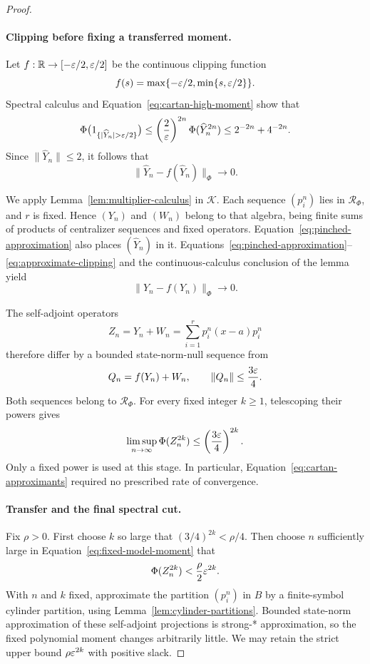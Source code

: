 \begin{proof}
\paragraph{Clipping before fixing a transferred moment.}
Let $f:\mathbb R\to[-\varepsilon/2,\varepsilon/2]$ be the continuous clipping function
\[
 f(s)=\max\{-\varepsilon/2,\min\{s,\varepsilon/2\}\}.
\]
Spectral calculus and Equation~\eqref{eq:cartan-high-moment} show that
\[
 \Phi\bigl(1_{\{|\widehat Y_n|>\eps/2\}}\bigr)
 \le\left(\frac2\eps\right)^{2n}\Phi(\widehat Y_n^{2n})
 \le2^{-2n}+4^{-2n}.
\]
Since $\|\widehat Y_n\|\le2$, it follows that
\begin{equation}\label{eq:approximate-clipping}
 \|\widehat Y_n-f(\widehat Y_n)\|_\Phi\longrightarrow0.
\end{equation}

We apply Lemma~\ref{lem:multiplier-calculus} in $\mathcal K$. Each sequence $(p_i^n)$ lies in $\mathscr R_\Phi$, and $r$ is fixed. Hence $(Y_n)$ and $(W_n)$ belong to that algebra, being finite sums of products of centralizer sequences and fixed operators. Equation~\eqref{eq:pinched-approximation} also places $(\widehat Y_n)$ in it. Equations~\eqref{eq:pinched-approximation}--\eqref{eq:approximate-clipping} and the continuous-calculus conclusion of the lemma yield
\begin{equation}\label{eq:original-clipping}
 \|Y_n-f(Y_n)\|_\Phi\longrightarrow0.
\end{equation}

The self-adjoint operators
\[
 Z_n=Y_n+W_n=\sum_{i=1}^r p_i^n(x-a)p_i^n
\]
therefore differ by a bounded state-norm-null sequence from
\[
 Q_n=f(Y_n)+W_n,\qquad \|Q_n\|\le\frac{3\varepsilon}{4}.
\]
Both sequences belong to $\mathscr R_\Phi$. For every fixed integer $k\ge1$, telescoping their powers gives
\begin{equation}\label{eq:fixed-model-moment}
 \limsup_{n\to\infty}\Phi(Z_n^{2k})
 \le\left(\frac{3\varepsilon}{4}\right)^{2k}.
\end{equation}
Only a fixed power is used at this stage. In particular, Equation~\eqref{eq:cartan-approximants} required no prescribed rate of convergence.

\paragraph{Transfer and the final spectral cut.}
Fix $\rho>0$. First choose $k$ so large that $(3/4)^{2k}<\rho/4$. Then choose $n$ sufficiently large in Equation~\eqref{eq:fixed-model-moment} that
\[
 \Phi(Z_n^{2k})<\frac\rho2\varepsilon^{2k}.
\]
With $n$ and $k$ fixed, approximate the partition $(p_i^n)$ in $B$ by a finite-symbol cylinder partition, using Lemma~\ref{lem:cylinder-partitions}. Bounded state-norm approximation of these self-adjoint projections is strong-* approximation, so the fixed polynomial moment changes arbitrarily little. We may retain the strict upper bound $\rho\varepsilon^{2k}$ with positive slack.


\end{proof}

